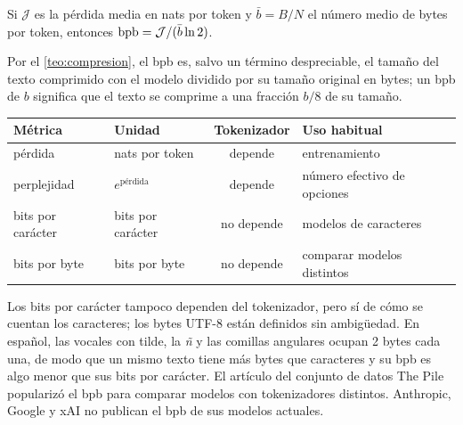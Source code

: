 \begin{proposicion}\label{prop:bpb}
Si $\mathcal{J}$ es la pérdida media en nats por token y $\bar b=B/N$ el número medio de bytes por token, entonces $\operatorname{bpb}=\mathcal{J}/(\bar b\ln 2)$.
\end{proposicion}

Por el \cref{teo:compresion}, el bpb es, salvo un término despreciable, el tamaño del texto comprimido con el modelo dividido por su tamaño original en bytes; un bpb de $b$ significa que el texto se comprime a una fracción $b/8$ de su tamaño.

\addtocounter{definicion}{1}%

\begin{center}
\begin{tabular}{@{}llcl@{}}
\toprule
Métrica & Unidad & Tokenizador & Uso habitual \\
\midrule
pérdida & nats por token & depende & entrenamiento \\
perplejidad & $e^{\text{pérdida}}$ & depende & número efectivo de opciones \\
bits por carácter & bits por carácter & no depende & modelos de caracteres \\
bits por byte & bits por byte & no depende & comparar modelos distintos \\
\bottomrule
\end{tabular}
\end{center}

Los bits por carácter tampoco dependen del tokenizador, pero sí de cómo se cuentan los caracteres; los bytes UTF-8 están definidos sin ambigüedad. En español, las vocales con tilde, la \emph{ñ} y las comillas angulares ocupan 2 bytes cada una, de modo que un mismo texto tiene más bytes que caracteres y su bpb es algo menor que sus bits por carácter. El artículo del conjunto de datos The Pile~\cite{pile} popularizó el bpb para comparar modelos con tokenizadores distintos. Anthropic, Google y xAI no publican el bpb de sus modelos actuales.

